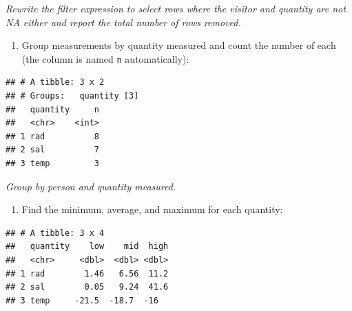 \documentclass[]{Nemilov}
\newenvironment{Shaded}{\begin{snugshade}}{\end{snugshade}}
\newcommand{\DataTypeTok}[1]{\textcolor[rgb]{0.13,0.29,0.53}{#1}}
\newcommand{\KeywordTok}[1]{\textcolor[rgb]{0.13,0.29,0.53}{\textbf{#1}}}
\newcommand{\NormalTok}[1]{#1}
\newcommand{\OperatorTok}[1]{\textcolor[rgb]{0.81,0.36,0.00}{\textbf{#1}}}
\newcommand{\StringTok}[1]{\textcolor[rgb]{0.31,0.60,0.02}{#1}}
\providecommand{\tightlist}{%
  \setlength{\itemsep}{0pt}\setlength{\parskip}{0pt}}
\begin{document}
\emph{Rewrite the filter expression to select rows where the visitor and quantity are not NA either and report the total number of rows removed.}

\begin{enumerate}
\def\labelenumi{\arabic{enumi}.}
\setcounter{enumi}{2}
\tightlist
\item
  Group measurements by quantity measured and count the number of each (the column is named \texttt{n} automatically):
\end{enumerate}

\begin{Shaded}
\end{Shaded}

\begin{verbatim}
## # A tibble: 3 x 2
## # Groups:   quantity [3]
##   quantity     n
##   <chr>    <int>
## 1 rad          8
## 2 sal          7
## 3 temp         3
\end{verbatim}

\emph{Group by person and quantity measured.}

\begin{enumerate}
\def\labelenumi{\arabic{enumi}.}
\setcounter{enumi}{3}
\tightlist
\item
  Find the minimum, average, and maximum for each quantity:
\end{enumerate}

\begin{Shaded}
\end{Shaded}

\begin{verbatim}
## # A tibble: 3 x 4
##   quantity    low    mid  high
##   <chr>     <dbl>  <dbl> <dbl>
## 1 rad        1.46   6.56  11.2
## 2 sal        0.05   9.24  41.6
## 3 temp     -21.5  -18.7  -16
\end{verbatim}
\end{document}
